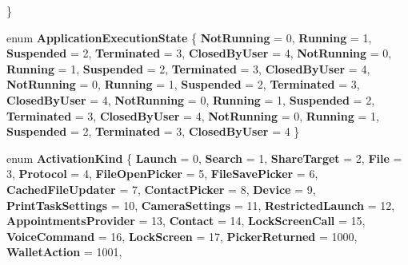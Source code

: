 \begin{DoxyCompactItemize}
 \}
\item 
\mbox{\label{namespace_windows_1_1_application_model_1_1_activation_a03c52b98bf1430c4332252ef7e86b265}} 
enum {\bfseries Application\+Execution\+State} \{ \newline
{\bfseries Not\+Running} = 0, 
{\bfseries Running} = 1, 
{\bfseries Suspended} = 2, 
{\bfseries Terminated} = 3, 
\newline
{\bfseries Closed\+By\+User} = 4, 
{\bfseries Not\+Running} = 0, 
{\bfseries Running} = 1, 
{\bfseries Suspended} = 2, 
\newline
{\bfseries Terminated} = 3, 
{\bfseries Closed\+By\+User} = 4, 
{\bfseries Not\+Running} = 0, 
{\bfseries Running} = 1, 
\newline
{\bfseries Suspended} = 2, 
{\bfseries Terminated} = 3, 
{\bfseries Closed\+By\+User} = 4, 
{\bfseries Not\+Running} = 0, 
\newline
{\bfseries Running} = 1, 
{\bfseries Suspended} = 2, 
{\bfseries Terminated} = 3, 
{\bfseries Closed\+By\+User} = 4, 
\newline
{\bfseries Not\+Running} = 0, 
{\bfseries Running} = 1, 
{\bfseries Suspended} = 2, 
{\bfseries Terminated} = 3, 
\newline
{\bfseries Closed\+By\+User} = 4
 \}
\item 
\mbox{\label{namespace_windows_1_1_application_model_1_1_activation_a21aa80ed65cf8b4f5d0d6c3b39f65284}} 
enum {\bfseries Activation\+Kind} \{ \newline
{\bfseries Launch} = 0, 
{\bfseries Search} = 1, 
{\bfseries Share\+Target} = 2, 
{\bfseries File} = 3, 
\newline
{\bfseries Protocol} = 4, 
{\bfseries File\+Open\+Picker} = 5, 
{\bfseries File\+Save\+Picker} = 6, 
{\bfseries Cached\+File\+Updater} = 7, 
\newline
{\bfseries Contact\+Picker} = 8, 
{\bfseries Device} = 9, 
{\bfseries Print\+Task\+Settings} = 10, 
{\bfseries Camera\+Settings} = 11, 
\newline
{\bfseries Restricted\+Launch} = 12, 
{\bfseries Appointments\+Provider} = 13, 
{\bfseries Contact} = 14, 
{\bfseries Lock\+Screen\+Call} = 15, 
\newline
{\bfseries Voice\+Command} = 16, 
{\bfseries Lock\+Screen} = 17, 
{\bfseries Picker\+Returned} = 1000, 
{\bfseries Wallet\+Action} = 1001, 

\end{DoxyCompactItemize}
